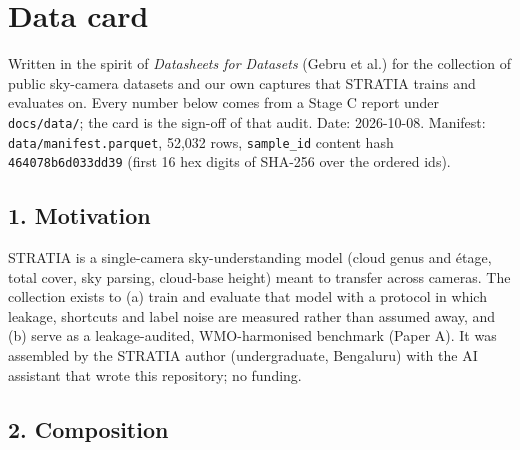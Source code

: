 \section{Data card}

Written in the spirit of \emph{Datasheets for Datasets} (Gebru et al.) for the collection of public sky-camera datasets and our own captures that STRATIA trains and evaluates on. Every number below comes from a Stage C report under \texttt{docs/data/}; the card is the sign-off of that audit. Date: 2026-10-08. Manifest: \texttt{data/manifest.parquet}, 52,032 rows, \texttt{sample\_\allowbreak{}id} content hash \texttt{464078b6d033dd39} (first 16 hex digits of SHA-256 over the ordered ids).

\subsection{1. Motivation}

STRATIA is a single-camera sky-understanding model (cloud genus and étage, total cover, sky parsing, cloud-base height) meant to transfer across cameras. The collection exists to (a) train and evaluate that model with a protocol in which leakage, shortcuts and label noise are measured rather than assumed away, and (b) serve as a leakage-audited, WMO-harmonised benchmark (Paper A). It was assembled by the STRATIA author (undergraduate, Bengaluru) with the AI assistant that wrote this repository; no funding.

\subsection{2. Composition}

